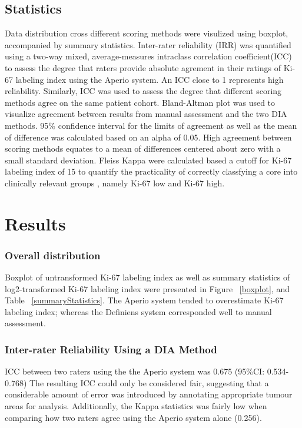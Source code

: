 \documentclass[final,5p,times,twocolumn]{elsarticle}
\begin{document}
\subsection*{Statistics}
Data distribution cross different scoring methods were visulized using boxplot, accompanied by summary statistics. Inter-rater reliability (IRR) was quantified using a two-way mixed, average-measures intraclass correlation coefficient(ICC) to assess the degree that raters provide absolute agrement in their ratings of Ki-67 labeling index using the Aperio system. An ICC close to 1 represents high reliability. Similarly, ICC was used to assess the degree that different scoring methods agree on the same patient cohort. Bland-Altman plot was used to visualize agreement between results from manual assessment and the two DIA methods. \cite{Bland1986} 95\% confidence interval for the limits of agreement as well as the mean of difference was calculated based on an alpha of 0.05. High agreement between scoring methods equates to a mean of differences centered about zero with a small standard deviation. Fleiss Kappa were calculated based a cutoff for Ki-67 labeling index of 15 to quantify the practicality of correctly classfying a core into clinically relevant groups , namely Ki-67 low and Ki-67 high.


\section*{Results}

\subsubsection*{Overall distribution}
Boxplot of untransformed Ki-67 labeling index as well as summary statistics of log2-transformed Ki-67 labeling index were presented in Figure ~\ref{boxplot}, and Table ~\ref{summaryStatistics}. The Aperio system tended to overestimate Ki-67 labeling index; whereas the Definiens system corresponded well to manual assessment.


\subsubsection*{Inter-rater Reliability Using a DIA Method}
ICC between two raters using the the Aperio system was 0.675 (95\%CI: 0.534-0.768) The resulting ICC could only be considered fair, suggesting that a considerable amount of error was introduced by annotating appropriate tumour areas for analysis. \cite{Cicchetti1994} Additionally, the Kappa statistics was fairly low when comparing how two raters agree using the Aperio system alone (0.256).
\end{document}
